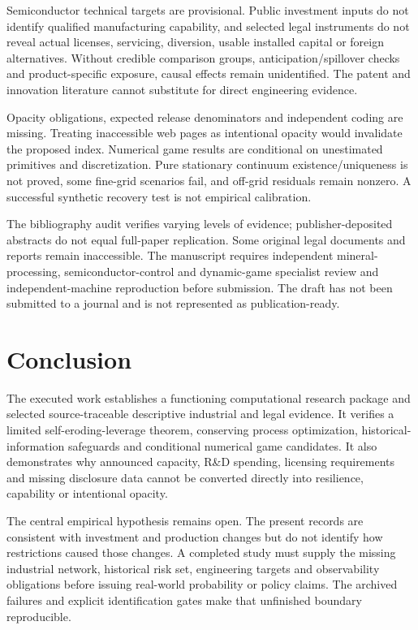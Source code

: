 \documentclass[11pt]{article}
\begin{document}
Semiconductor technical targets are provisional. Public investment inputs do not identify qualified manufacturing capability, and selected legal instruments do not reveal actual licenses, servicing, diversion, usable installed capital or foreign alternatives. Without credible comparison groups, anticipation/spillover checks and product-specific exposure, causal effects remain unidentified. The patent and innovation literature cannot substitute for direct engineering evidence.

Opacity obligations, expected release denominators and independent coding are missing. Treating inaccessible web pages as intentional opacity would invalidate the proposed index. Numerical game results are conditional on unestimated primitives and discretization. Pure stationary continuum existence/uniqueness is not proved, some fine-grid scenarios fail, and off-grid residuals remain nonzero. A successful synthetic recovery test is not empirical calibration.

The bibliography audit verifies varying levels of evidence; publisher-deposited abstracts do not equal full-paper replication. Some original legal documents and reports remain inaccessible. The manuscript requires independent mineral-processing, semiconductor-control and dynamic-game specialist review and independent-machine reproduction before submission. The draft has not been submitted to a journal and is not represented as publication-ready.

\section{Conclusion}
The executed work establishes a functioning computational research package and selected source-traceable descriptive industrial and legal evidence. It verifies a limited self-eroding-leverage theorem, conserving process optimization, historical-information safeguards and conditional numerical game candidates. It also demonstrates why announced capacity, R\&D spending, licensing requirements and missing disclosure data cannot be converted directly into resilience, capability or intentional opacity.

The central empirical hypothesis remains open. The present records are consistent with investment and production changes but do not identify how restrictions caused those changes. A completed study must supply the missing industrial network, historical risk set, engineering targets and observability obligations before issuing real-world probability or policy claims. The archived failures and explicit identification gates make that unfinished boundary reproducible.
\end{document}
